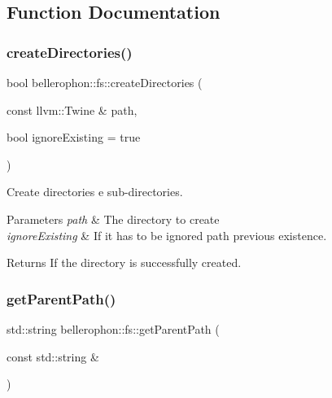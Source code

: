 \subsection{Function Documentation}
\hypertarget{namespacebellerophon_1_1fs_a863646cc2d1337eb038f7fdb45012a3a}{}\label{namespacebellerophon_1_1fs_a863646cc2d1337eb038f7fdb45012a3a} 
\subsubsection{\texorpdfstring{create\+Directories()}{createDirectories()}}
{\footnotesize\ttfamily bool bellerophon\+::fs\+::create\+Directories (\begin{DoxyParamCaption}\item[{const llvm\+::\+Twine \&}]{path,  }\item[{bool}]{ignore\+Existing = {\ttfamily true} }\end{DoxyParamCaption})}



Create directories e sub-\/directories. 


\begin{DoxyParams}{Parameters}
{\em path} & The directory to create \\
\hline
{\em ignore\+Existing} & If it has to be ignored path previous existence. \\
\hline
\end{DoxyParams}
\begin{DoxyReturn}{Returns}
If the directory is successfully created. 
\end{DoxyReturn}
\hypertarget{namespacebellerophon_1_1fs_acd4c35b60168bc21d107608e56128664}{}\label{namespacebellerophon_1_1fs_acd4c35b60168bc21d107608e56128664} 
\subsubsection{\texorpdfstring{get\+Parent\+Path()}{getParentPath()}}
{\footnotesize\ttfamily std\+::string bellerophon\+::fs\+::get\+Parent\+Path (\begin{DoxyParamCaption}\item[{const std\+::string \&}]{ }\end{DoxyParamCaption})}



